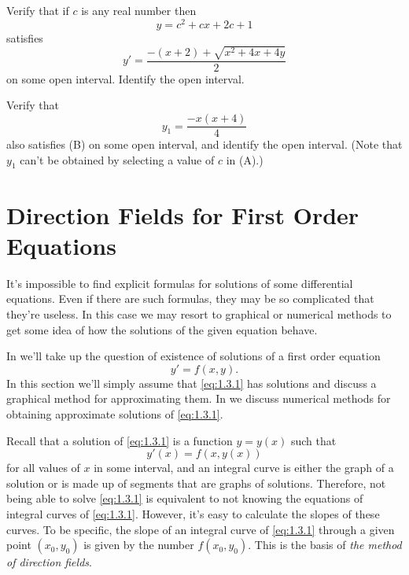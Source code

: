 \begin{exerciselist}
\item\label{exer:1.2.10}\begin{alist}
\item %
Verify that if $c$ is any real number then
\[
y=c^2+cx+2c+1\tag{A}
\]
satisfies
\[
 y'=\frac{-(x+2)+\sqrt{x^2+4x+4y}}{2}\tag{B}
\]
on some open interval. Identify the open interval.

\item %
Verify that
\[
y_1=\frac{-x(x+4)}{4}
\]
also satisfies  (B) on some open interval, and
identify the open interval. (Note that $y_1$ can't be obtained
by selecting a value of $c$ in (A).)
\end{alist}

\end{exerciselist}

\section{Direction Fields for First Order Equations}\label{sec:dir_fields}

It's impossible to find explicit formulas for solutions of some
differential equations. Even if there are such  formulas, they may be
so complicated that they're useless. In this case we may resort to
graphical or numerical methods to get some idea of how the solutions
of the given equation behave.

In  we'll take up
the question of existence of solutions of a first order equation
\begin{equation} \label{eq:1.3.1}
y'=f(x,y).
\end{equation}
In this section we'll simply assume that \eqref{eq:1.3.1} has
solutions and discuss a graphical method for approximating them.
In  we discuss numerical methods for obtaining
approximate solutions of \eqref{eq:1.3.1}.

Recall that a solution of \eqref{eq:1.3.1} is a function $y=y(x)$ such
that
\[
y'(x)=f(x,y(x))
\]
for all values of $x$ in some interval, and an integral
curve is either the graph of a solution or is
made up of  segments that are graphs of solutions.
 Therefore, not being able to
solve \eqref{eq:1.3.1} is equivalent to not knowing the equations of
integral curves of \eqref{eq:1.3.1}. However, it's easy to calculate the
slopes of these curves. To be specific, the slope of an integral curve
of \eqref{eq:1.3.1} through a given point $(x_0,y_0)$ is given by the
number $f(x_0,y_0)$. This is the basis of \emph{\color{blue}the method of direction fields}.

